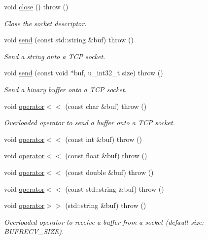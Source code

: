 \begin{CompactItemize}
void \hyperlink{classSocket_75ee749264ccbcfc4dfbf5442e55dcb8}{close} ()  throw ()
\begin{CompactList}\small\item\em Close the socket descriptor. \item\end{CompactList}\item 
void \hyperlink{classSocket_d9819dba14b732d575bf3dc1e376677c}{send} (const std::string \&buf)  throw ()
\begin{CompactList}\small\item\em Send a string onto a TCP socket. \item\end{CompactList}\item 
void \hyperlink{classSocket_e19472a87361143b4e3e2730e69b5955}{send} (const void $\ast$buf, u\_\-int32\_\-t size)  throw ()
\begin{CompactList}\small\item\em Send a binary buffer onto a TCP socket. \item\end{CompactList}\item 
void \hyperlink{classSocket_0980ddfd4e759553b20e5e517f2f9fc2}{operator$<$$<$} (const char \&buf)  throw ()
\begin{CompactList}\small\item\em Overloaded operator to send a buffer onto a TCP socket. \item\end{CompactList}\item 
void \hyperlink{classSocket_517cbbbff8acd1aff6d8175559bc531f}{operator$<$$<$} (const int \&buf)  throw ()
\item 
void \hyperlink{classSocket_6ea159d9fa113f2e9f5a01f2e29fb295}{operator$<$$<$} (const float \&buf)  throw ()
\item 
void \hyperlink{classSocket_41b423cfc8d93f8a66de428f8699cdd7}{operator$<$$<$} (const double \&buf)  throw ()
\item 
void \hyperlink{classSocket_5bcc8d8ed10662161b8c3e07f9c31421}{operator$<$$<$} (const std::string \&buf)  throw ()
\item 
void \hyperlink{classSocket_a24765df6a964745bf202573ff79e543}{operator$>$$>$} (std::string \&buf)  throw ()
\begin{CompactList}\small\item\em Overloaded operator to receive a buffer from a socket (default size: BUFRECV\_\-SIZE). \item\end{CompactList}\item 

\end{CompactItemize}
